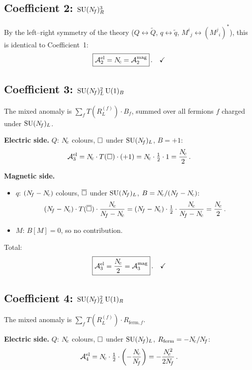 \documentclass[11pt,a4paper]{article}
\begin{document}
\subsection{Coefficient 2: $\mathrm{SU}(N_{\!f})_R^3$}
\label{ssec:anom2}

By the left--right symmetry of the theory ($Q \leftrightarrow \widetilde{Q}$,
$q \leftrightarrow \widetilde{q}$, $M^i{}_j \leftrightarrow (M^j{}_i)^*$),
this is identical to Coefficient~1:
\begin{equation}\label{eq:anom2}
  \boxed{\mathcal{A}^{\text{el}}_2 = N_{\!c}
    = \mathcal{A}^{\text{mag}}_2}\,.
  \quad\checkmark
\end{equation}

\subsection{Coefficient 3: $\mathrm{SU}(N_{\!f})_L^2\,\mathrm{U}(1)_B$}
\label{ssec:anom3}

The mixed anomaly is $\sum_f T(R^{(f)}_L) \cdot B_f$, summed over all
fermions $f$ charged under $\mathrm{SU}(N_{\!f})_L$.

\textbf{Electric side.}  $Q$: $N_{\!c}$ colours, $\square$ under $\mathrm{SU}(N_{\!f})_L$,
$B = +1$:
\[
  \mathcal{A}^{\text{el}}_3 = N_{\!c} \cdot T(\square) \cdot (+1)
  = N_{\!c} \cdot \tfrac{1}{2} \cdot 1 = \frac{N_{\!c}}{2}\,.
\]

\textbf{Magnetic side.}
\begin{itemize}
  \item $q$: $(N_{\!f} - N_{\!c})$ colours, $\overline{\square}$ under $\mathrm{SU}(N_{\!f})_L$,
    $B = N_{\!c}/(N_{\!f} - N_{\!c})$:
    \[
      (\Nf - \Nc) \cdot T(\antifund) \cdot \frac{\Nc}{\Nf - \Nc}
      = (\Nf - \Nc) \cdot \tfrac{1}{2} \cdot \frac{\Nc}{\Nf - \Nc}
      = \frac{\Nc}{2}\,.
    \]
  \item $M$: $B[M] = 0$, so no contribution.
\end{itemize}
Total:
\begin{equation}\label{eq:anom3}
  \boxed{\mathcal{A}^{\text{el}}_3 = \frac{N_{\!c}}{2}
    = \mathcal{A}^{\text{mag}}_3}\,.
  \quad\checkmark
\end{equation}

\subsection{Coefficient 4: $\mathrm{SU}(N_{\!f})_L^2\,\mathrm{U}(1)_R$}
\label{ssec:anom4}

The mixed anomaly is $\sum_f T(R^{(f)}_L) \cdot R_{\text{ferm},f}$.

\textbf{Electric side.}  $Q$: $N_{\!c}$ colours, $\square$ under $\mathrm{SU}(N_{\!f})_L$,
$R_{\text{ferm}} = -N_{\!c}/N_{\!f}$:
\[
  \mathcal{A}^{\text{el}}_4 = N_{\!c} \cdot \tfrac{1}{2} \cdot
  \left(-\frac{N_{\!c}}{N_{\!f}}\right) = -\frac{N_{\!c}^2}{2N_{\!f}}\,.
\]
\end{document}
